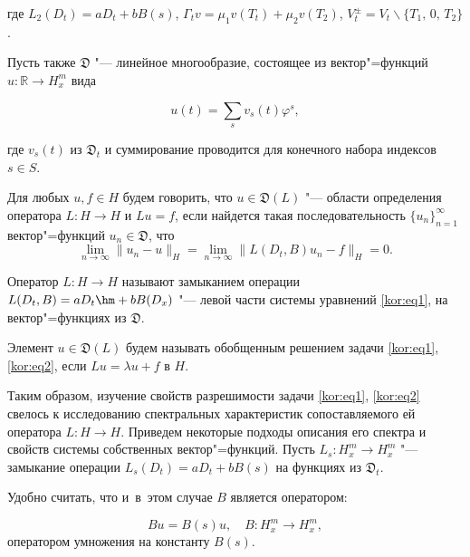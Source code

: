 где $L_2(D_t)=aD_t+bB(s)$, $\Gamma_t v=\mu_1v(T_t)+\mu_2v(T_2)$, $V_t^\pm=V_t\backslash\{T_1,\,0,\,T_2\}$.



Пусть также $\mathfrak{D}$ "--- линейное многообразие, состоящее из вектор"=функций $u:\mathbb{R}\to H_x^m$ вида

\begin{equation}

\label{kor:eq5}

u(t)=\sum\limits_s{v_s(t)\varphi^s,} 

\end{equation}

где $v_{s}(t)$ из $\mathfrak{D}_t$ и суммирование проводится для конечного набора индексов $s\in S$.



Для любых $u,f\in H$ будем говорить, что $u\in\mathfrak{D}(L)$ "--- области определения оператора $L:H\to H$ и $Lu=f$, если найдется такая последовательность $\{u_n\}_{n=1}^\infty$ вектор"=функций $u_n\in\mathfrak{D}$, что $$\lim\limits_{n\to\infty}\|u_n-u\|_H=\lim\limits_{n\to\infty}\|L(D_t,B)u_n-f\|_H=0.$$ 

Оператор $L:H\to H$ называют замыканием операции $L(D_t,B)=aD_t\hm +bB(D_x)$ "--- левой части системы уравнений \eqref{kor:eq1}, на вектор"=функциях из $\mathfrak{D}$.



\smallskip



\begin{definition}[1] Элемент $u\in\mathfrak{D}(L)$ будем называть обобщенным решением задачи \eqref{kor:eq1}, \eqref{kor:eq2}, если $Lu=\lambda u+f$ в $H$.

\end{definition}



\smallskip



Таким образом, изучение свойств разрешимости задачи \eqref{kor:eq1}, \eqref{kor:eq2} свелось к исследованию спектральных характеристик сопоставляемого ей оператора $L:H\to H$. Приведем некоторые подходы описания его спектра и свойств системы собственных вектор"=функций. Пусть $L_s:H_x^m\to H_x^m$ "--- замыкание операции $L_s(D_t)=aD_t+bB(s)$ на функциях из $\mathfrak{D}_t$. 

Удобно считать, что и~в~этом случае $B$ является оператором: 

$$Bu=B(s)u,\quad  B:H_x^m\to H_x^m,$$ оператором умножения на константу $B(s)$. 

